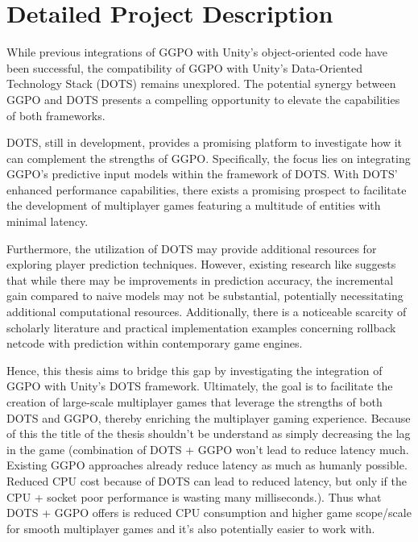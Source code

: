 \chapter{Detailed Project Description}

While previous integrations of GGPO with Unity's object-oriented code have been successful, the compatibility of GGPO with Unity's Data-Oriented Technology Stack (DOTS) remains unexplored. The potential synergy between GGPO and DOTS presents a compelling opportunity to elevate the capabilities of both frameworks.

DOTS, still in development, provides a promising platform to investigate how it can complement the strengths of GGPO. Specifically, the focus lies on integrating GGPO's predictive input models within the framework of DOTS. With DOTS' enhanced performance capabilities, there exists a promising prospect to facilitate the development of multiplayer games featuring a multitude of entities with minimal latency.

Furthermore, the utilization of DOTS may provide additional resources for exploring player prediction techniques. However, existing research like \cite{Improving_prediction} suggests that while there may be improvements in prediction accuracy, the incremental gain compared to naive models may not be substantial, potentially necessitating additional computational resources. Additionally, there is a noticeable scarcity of scholarly literature and practical implementation examples concerning rollback netcode with prediction within contemporary game engines.

Hence, this thesis aims to bridge this gap by investigating the integration of GGPO with Unity's DOTS framework. Ultimately, the goal is to facilitate the creation of large-scale multiplayer games that leverage the strengths of both DOTS and GGPO, thereby enriching the multiplayer gaming experience. Because of this the title of the thesis shouldn't be understand as simply decreasing the lag in the game (combination of DOTS + GGPO won't lead to reduce latency much. Existing GGPO approaches already reduce latency as much as humanly possible. Reduced CPU cost because of DOTS can lead to reduced latency, but only if the CPU + socket poor performance is wasting many milliseconds.). Thus what DOTS + GGPO offers is reduced CPU consumption and higher game scope/scale for smooth multiplayer games and it's also potentially easier to work with.\newline

